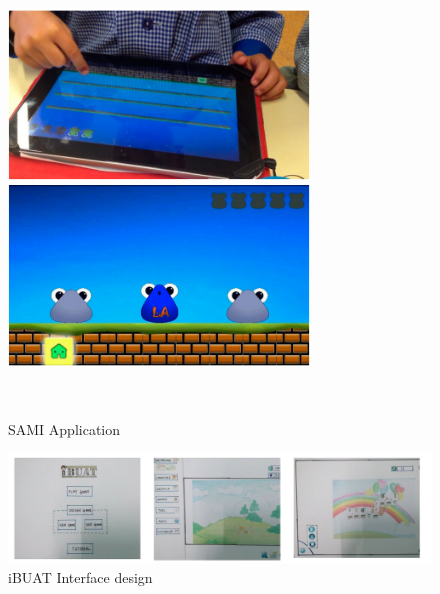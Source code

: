 \begin{figure}[H]
    \centering
    \includegraphics[width=8cm]{figures/sami_interacting.PNG}
    \includegraphics[width=8cm]{figures/sami_memory.PNG}
    \caption{SAMI Application \protect\cite{paule2017music}}
    \label{fig:sami_memory}
    \
\end{figure}


\begin{figure}[H]
    \centering
    \includegraphics[width=14cm]{figures/iBUAT_design.PNG}
    \caption{iBUAT Interface design \protect\cite{ibharim2014ibuat}}
    \label{fig:iBuAT_ui}
\end{figure}


